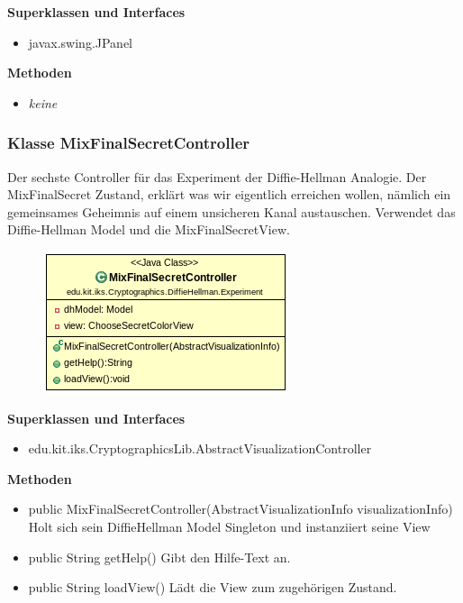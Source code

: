 \documentclass{article}
\begin{document}
      \textbf{Superklassen und Interfaces}
      \begin{itemize}
        \item javax.swing.JPanel
      \end{itemize}

      \textbf{Methoden}
      \begin{itemize}
        \item \textit{keine}
      \end{itemize}

\subsubsection{Klasse MixFinalSecretController}
      Der sechste Controller für das Experiment der Diffie-Hellman Analogie.
      Der MixFinalSecret Zustand, erklärt was wir eigentlich erreichen wollen,
      nämlich ein gemeinsames Geheimnis auf einem unsicheren Kanal austauschen.
      Verwendet das Diffie-Hellman Model und die MixFinalSecretView.

      \begin{figure}[H]
        \centering
        \includegraphics{resources/edu-kit-iks-Cryptographics-DiffieHellman-Experiment-MixFinalSecretController}
      \end{figure}

      \textbf{Superklassen und Interfaces}
      \begin{itemize}
        \item edu.kit.iks.CryptographicsLib.AbstractVisualizationController
      \end{itemize}

      \textbf{Methoden}
      \begin{itemize}
          \item public MixFinalSecretController(AbstractVisualizationInfo visualizationInfo) \newline
              Holt sich sein DiffieHellman Model Singleton und instanziiert seine View
        \item public String getHelp() \newline
        Gibt den Hilfe-Text an.
        \item public String loadView() \newline
        Lädt die View zum zugehörigen Zustand.
      \end{itemize}
\end{document}

